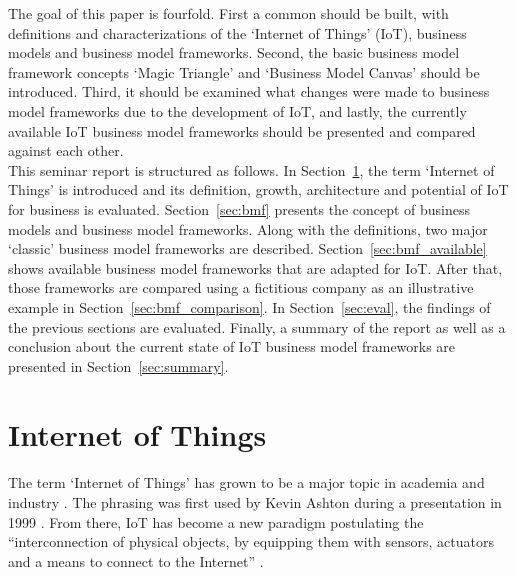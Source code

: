 	The goal of this paper is fourfold. First a common should be built, with definitions and characterizations of the `Internet of Things' (IoT), business models and business model frameworks. Second, the basic business model framework concepts `Magic Triangle' and `Business Model Canvas' should be introduced. Third, it should be examined what changes were made to business model frameworks due to the development of IoT, and lastly, the currently available IoT business model frameworks should be presented and compared against each other.\\
	This seminar report is structured as follows. In Section~\ref{sec:iot}, the term `Internet of Things' is introduced and its definition, growth, architecture and potential of IoT for business is evaluated. Section~\ref{sec:bmf} presents the concept of business models and business model frameworks. Along with the definitions, two major `classic' business model frameworks are described. Section~\ref{sec:bmf_available} shows available business model frameworks that are adapted for IoT. After that, those frameworks are compared using a fictitious company as an illustrative example in Section~\ref{sec:bmf_comparison}. In Section~\ref{sec:eval}, the findings of the previous sections are evaluated. Finally, a summary of the report as well as a conclusion about the current state of IoT business model frameworks are presented in Section~\ref{sec:summary}. 
 
\section{Internet of Things}
\label{sec:iot}
	The term `Internet of Things' has grown to be a major topic in academia and industry \cite{ju}. The phrasing was first used by Kevin Ashton during a presentation in 1999 . From there, IoT has become a new paradigm postulating the ``interconnection of physical objects, by equipping them with sensors, actuators and a means to connect to the Internet'' \cite{dijkman} .


